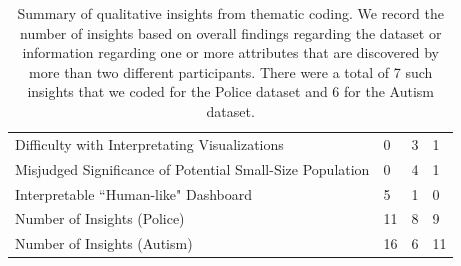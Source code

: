 \begin{table}[ht!]
	\centering
	\begin{tabular}{|l|l|l|l|}
	\hline & \system & \cluster & \BFS \\ \hline
	Difficulty with Interpretating Visualizations & 0 & \cellcolor[HTML]{FD6864}3 & 1 \\ \hline
	Misjudged Significance of Potential Small-Size Population & 0 & \cellcolor[HTML]{FD6864}4 & 1 \\ \hline
	Interpretable ``Human-like" Dashboard & \cellcolor[HTML]{9AFF99}5 & 1 & 0 \\ \hline
	Number of Insights (Police) & \cellcolor[HTML]{9AFF99}11 & 8 & 9 \\ \hline
	Number of Insights (Autism) & \cellcolor[HTML]{9AFF99}16 & 6 & 11 \\\hline
	\end{tabular}
\caption{Summary of qualitative insights from thematic coding. We record the number of insights based on overall findings regarding the dataset or information regarding one or more attributes that are discovered by more than two different participants. There were a total of 7 such insights that we coded for the Police dataset and 6 for the Autism dataset.}
\label{table:thematic_summary}
\end{table}
